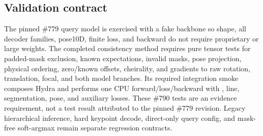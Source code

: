 \subsection{Validation contract}

The pinned \#779 query model is exercised with a fake \DINO{} backbone so shape, all decoder
families, pose10D, finite loss, and backward do not require proprietary or large
weights.  The completed consistency method requires pure tensor tests for
padded-mask exclusion, known expectations, invalid masks, pose projection,
physical ordering, zero/known offsets, cheirality, and gradients to raw
rotation, translation, focal, and both model branches.  Its required integration
smoke composes Hydra and performs one CPU forward/loss/backward with \KP, line,
segmentation, pose, and auxiliary losses.  These \#790 tests are an evidence
requirement, not a test result attributed to the pinned \#779 revision.
Legacy hierarchical inference, hard keypoint decode, direct-only query config,
and mask-free soft-argmax remain separate regression contracts.
